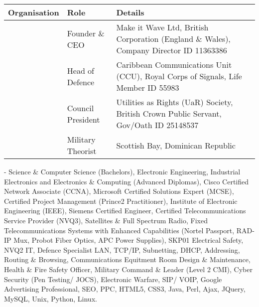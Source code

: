 \documentclass[letterpaper,10pt,english]{sphinxmanual}
\begin{document}
\begin{savenotes}\sphinxattablestart
\centering
\begin{tabulary}{\linewidth}[t]{|T|T|T|}
\hline
\sphinxstyletheadfamily 
Organisation
&\sphinxstyletheadfamily 
Role
&\sphinxstyletheadfamily 
Details
\\
\hline
\noindent{}
&
Founder \& CEO
&
Make it Wave Ltd, British Corporation (England \& Wales), Company Director ID 11363386
\\
\hline
\noindent{}
&
Head of Defence
&
Caribbean Communications Unit (CCU), Royal Corps of Signals, Life Member ID 55983
\\
\hline
\noindent{}
&
Council President
&
Utilities as Rights (UaR) Society, British Crown Public Servant, Gov/Oath ID 25148537
\\
\hline
\noindent{}
&
Military Theorist
&
Scottish Bay, Dominican Republic
\\
\hline
\end{tabulary}
\par
\sphinxattableend\end{savenotes}

 - Science \& Computer Science (Bachelors), Electronic Engineering, Industrial Electronics and Electronics \& Computing (Advanced Diplomas), Cisco Certified Network Associate (CCNA), Microsoft Certified Solutions Expert (MCSE), Certified Project Management (Prince2 Practitioner), Institute of Electronic Engineering (IEEE), Siemens Certified Engineer, Certified Telecommunications Service Provider (NVQ3), Satellites \& Full Spectrum Radio, Fixed Telecommunications Systems with Enhanced Capabilities (Nortel Passport, RAD-IP Mux, Probot Fiber Optics, APC Power Supplies), SKP01 Electrical Safety, NVQ2 IT, Defence Specialist LAN, TCP/IP, Subnetting, DHCP, Addressing, Routing \& Browsing, Communications Equitment Room Design \& Maintenance, Health \& Fire Safety Officer, Military Command \& Leader (Level 2 CMI),  Cyber Security (Pen Testing/ JOCS), Electronic Warfare, SIP/ VOIP, Google Advertising Professional, SEO, PPC, HTML5, CSS3, Java, Perl, Ajax, JQuery, MySQL, Unix, Python, Linux.



\renewcommand{\indexname}{Index}
\printindex
\end{document}
